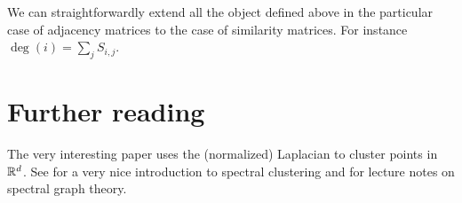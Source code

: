 \documentclass[11pt,nocut]{article}
\begin{document}
We can straightforwardly extend all the object defined above in the particular case of adjacency matrices to the case of similarity matrices. For instance $\deg(i) = \sum_{j} S_{i,j}$.


\section*{Further reading}

The very interesting paper \cite{ng2002spectral} uses the (normalized) Laplacian to cluster points in $\mathbb{R}^d$.
See \cite{von2007tutorial} for a very nice introduction to spectral clustering and \cite{spielman2012spectral} for lecture notes on spectral graph theory.


\vspace{1cm}
\centerline{}




\end{document}
